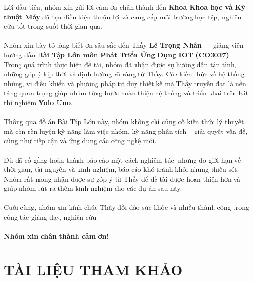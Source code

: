 \documentclass[12pt,a4paper]{article}
\begin{document}
Lời đầu tiên, nhóm xin gửi lời cảm ơn chân thành đến \textbf{Khoa Khoa học và Kỹ thuật Máy} đã tạo điều kiện thuận lợi và cung cấp môi trường học tập, nghiên cứu tốt trong suốt thời
gian qua. \\
\\
Nhóm xin bày tỏ lòng biết ơn sâu sắc đến Thầy \textbf{Lê Trọng Nhân} — giảng viên hướng
dẫn \textbf{Bài Tập Lớn môn Phát Triển Ứng Dụng IOT (CO3037)}. Trong quá trình thực hiện đề
tài, nhóm đã nhận được sự hướng dẫn tận tình, những góp ý kịp thời và định hướng rõ ràng
từ Thầy. Các kiến thức về hệ thống nhúng, vi điều khiển và phương pháp tư duy thiết kế mà
Thầy truyền đạt là nền tảng quan trọng giúp nhóm từng bước hoàn thiện hệ thống và triển
khai trên Kit thí nghiệm \textbf{Yolo Uno}. \\ 
\\
Thông qua đồ án Bài Tập Lớn này, nhóm không chỉ củng cố kiến thức lý
thuyết mà còn rèn luyện kỹ năng làm việc nhóm, kỹ năng phân tích – giải quyết vấn đề, cũng
như tiếp cận và ứng dụng các công nghệ mới. \\
\\
Dù đã cố gắng hoàn thành báo cáo một cách nghiêm túc, nhưng do giới hạn về thời gian, tài
nguyên và kinh nghiệm, báo cáo khó tránh khỏi những thiếu sót. Nhóm rất mong nhận được
sự góp ý từ Thầy để đề tài được hoàn thiện hơn và giúp nhóm rút ra thêm kinh nghiệm cho
các dự án sau này. \\
\\
Cuối cùng, nhóm xin kính chúc Thầy dồi dào sức khỏe và nhiều thành công trong công tác
giảng dạy, nghiên cứu. \\
\\
\textbf{Nhóm xin chân thành cảm ơn!}


{}

\setlength{\parindent}{0pt}
\setlength{\parskip}{0.6em}


\cleardoublepage
\renewcommand{\contentsname}{Mục lục}
\tableofcontents


\newpage




\newpage

\setlength{\parindent}{0pt} %
\setcounter{page}{1}









\newpage
\section*{TÀI LIỆU THAM KHẢO}
\end{document}
